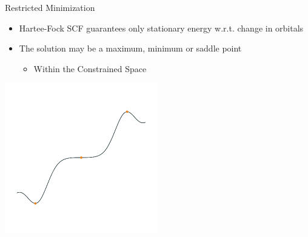 \documentclass[10pt]{beamer}
\begin{document}
{{%


\begin{frame}[fragile]{Restricted Minimization}
	\begin{itemize}
		\item<1-> Hartee-Fock SCF guarantees only stationary energy w.r.t. change in orbitals
		\item<1-> The solution may be a maximum, minimum or saddle point 
		\begin{itemize}
			\item<2->[] \begin{alertblock}{Within the Constrained Space} \end{alertblock}
		\end{itemize}
	\end{itemize}
	\begin{center}
		\includegraphics[width=0.5\textwidth]{../images/1d_extrema.pdf}
	\end{center}
\end{frame}

}}
\end{document}
